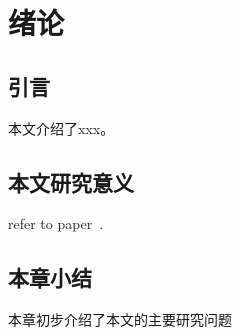 \newpage
{}
\section{绪论}\label{sec:introduction}
\subsection{引言} %

本文介绍了xxx。

\subsection{本文研究意义}\label{subsec:introduction_meaning}
refer to paper~\cite{paper}.


\subsection{本章小结}
本章初步介绍了本文的主要研究问题